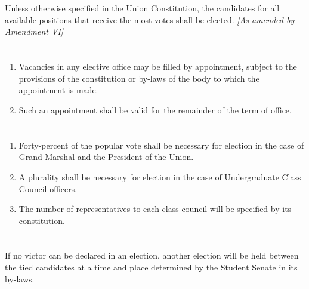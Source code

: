 \documentclass{uniondoc}
\begin{document}
\section{}

Unless otherwise specified in the Union Constitution, the candidates for all available positions that receive the most votes shall be elected. \textit{[As amended by Amendment VI]}

\section{}

\begin{enumerate}
\item Vacancies in any elective office may be filled by appointment, subject to the provisions of the constitution or by-laws of the body to which the appointment is made.
\item Such an appointment shall be valid for the remainder of the term of office.
\end{enumerate}

\section{}

\begin{enumerate}
\item Forty-percent of the popular vote shall be necessary for election in the case of Grand Marshal and the President of the Union.
\item A plurality shall be necessary for election in the case of Undergraduate Class Council officers.
\item The number of representatives to each class council will be specified by its constitution.
\end{enumerate}

\section{}

If no victor can be declared in an election, another election will be held between the tied candidates at a time and place determined by the Student Senate in its by-laws.

\section{}
\end{document}
